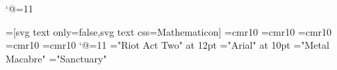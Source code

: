 \catcode`@=11\relax





\ifHtml
	
	=[svg text only=false,svg text css=Mathematicon]%
	\font\LD@Font@Tiny=cmr10\relax
	\font\LD@Font@Inferno=cmr10\relax
	\font\LD@Font@Arial=cmr10\relax
	\font\LD@Font@Gothic=cmr10\relax
	\font\LD@Font@Sanctuary=cmr10\relax
\else
	\LD@AFour@Book
	\catcode`@=11\relax
	\let\LD@Font@Tiny\fiverm\relax
	\font\LD@Font@Inferno="Riot Act Two" at 12pt\relax
	\font\LD@Font@Arial="Arial" at 10pt\relax
	\font\LD@Font@Gothic="Metal Macabre"\relax
	\font\LD@Font@Sanctuary="Sanctuary"\relax
\fi
\tenrm



\newcount\LD@Count@Temp


\newif\ifLD@Inferno@Master@\LD@Inferno@Master@false
\LD@Exo@Label@Hide



\def\LD@Exercice@Display@Code{}%
\gdef\LD@Exercice@Solution@List{}%
\gdef\LD@Exercice@Indication@List{}%
\gdef\LD@Exercice@Notion@List{}%
\def\LD@Exercice@Display@Code@Post{%
	\ifcsname LD@Exo@@Solution\endcsname
		\unless\ifx\LD@Exo@@Solution\LD@Empty
			\ifLD@Inferno@Master@
				\pn{\eightpts Solution : \eightpts \LD@Exo@@Solution}%
			\else
				\ifx\LD@Exercice@Solution@List\LD@Empty
					\EA\gdef\EA\LD@Exercice@Solution@List\EA{\LD@Option@@Label}%
				\else
					\EA\EA\EA\gdef\EA\EA\EA\LD@Exercice@Solution@List\EA\EA\EA{\EA\LD@Exercice@Solution@List\EA ,\LD@Option@@Label}%
				\fi
			\fi
		\fi
	\fi
	\ifcsname LD@Exo@@Notion\endcsname
		\unless\ifx\LD@Exo@@Notion\LD@Empty
			\ifLD@Inferno@Master@
				\pn{\eightpts Notions intervenant dans la solution : \eightpts \LD@Exo@@Notion}%
			\else
				\ifx\LD@Exercice@Notion@List\LD@Empty
					\EA\gdef\EA\LD@Exercice@Notion@List\EA{\LD@Option@@Label}%
				\else
					\EA\EA\EA\gdef\EA\EA\EA\LD@Exercice@Notion@List\EA\EA\EA{\EA\LD@Exercice@Notion@List\EA ,\LD@Option@@Label}%
				\fi
			\fi	
		\fi
	\fi
	\ifcsname LD@Exo@@Indication\endcsname
		\unless\ifx\LD@Exo@@Indication\LD@Empty
			\ifLD@Inferno@Master@
				\pn{\eightpts Indication : \eightpts \LD@Exo@@Indication}%
			\else
				\ifx\LD@Exercice@Indication@List\LD@Empty
					\EA\gdef\EA\LD@Exercice@Indication@List\EA{\LD@Option@@Label}%
					\else
					\EA\EA\EA\gdef\EA\EA\EA\LD@Exercice@Indication@List\EA\EA\EA{\EA\LD@Exercice@Indication@List\EA ,\LD@Option@@Label}%
				\fi
			\fi
		\fi
	\fi
	\medskip\penalty-100
}%
\def\LD@Display#1{%
	\LD@Count@Temp=#1\relax
	\ifcase\LD@Count@Temp
	\or
	Math. Sup.
	\or
	Math. Spé
	\else
	\fi
}%


